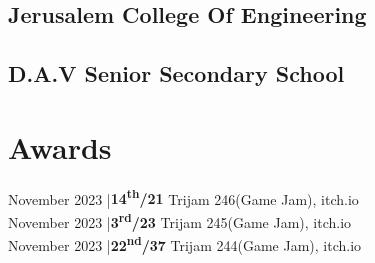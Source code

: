 \documentclass[]{deedy-resume-openfont}
\begin{document}
\begin{minipage}[t]{0.33\textwidth}
\subsection{Jerusalem College Of Engineering}
\sectionsep

\subsection{D.A.V Senior Secondary School}
\sectionsep


\section{Awards}
November 2023 |{\bf 14\textsuperscript{th}/21} Trijam 246(Game Jam), itch.io\\
November 2023 |{\bf 3\textsuperscript{rd}/23}  Trijam 245(Game Jam), itch.io\\
November 2023 |{\bf 22\textsuperscript{nd}/37} Trijam 244(Game Jam), itch.io\\
\sectionsep

%
%

\end{minipage} 
\hfill
\end{document}
